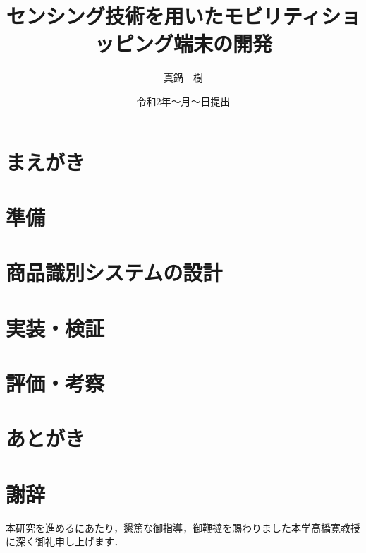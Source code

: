 
\newenvironment{indention}[1]{\par
\addtolength{\leftskip}{#1}
\begingroup}{\endgroup\par}

\title{センシング技術を用いたモビリティショッピング端末の開発}
\author{真鍋　樹}
\date{令和2年～月～日提出}


\maketitle
\tableofcontents
\cleardoublepage
{}

\chapter{まえがき}


\chapter{準備}


\chapter{商品識別システムの設計}






\chapter{実装・検証}




\chapter{評価・考察}

%
%

\chapter{あとがき}



\newpage
{}
\chapter*{謝辞}
本研究を進めるにあたり，懇篤な御指導，御鞭撻を賜わりました本学高橋寛教授に深く御礼申し上げます．

